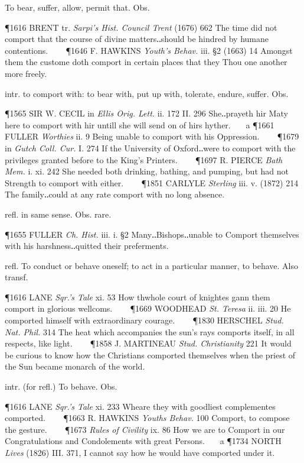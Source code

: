 \begin{description}[wide, labelwidth=!, labelindent=0pt]
\begin{myenumerate}
 To bear, suffer, allow, permit that. Obs.

\P 1616 BRENT tr.  \textit{Sarpi's Hist. Council Trent} (1676) 662 The time did not comport that the course of divine matters‥should be hindred by humane contentions.    
\P 1646 F. HAWKINS  \textit{Youth's Behav.} iii. §2 (1663) 14 Amongst them the custome doth comport in certain places that they Thou one another more freely.

 intr. to comport with: to bear with, put up with, tolerate, endure, suffer. Obs.

\P 1565 SIR W. CECIL in \textit{Ellis Orig. Lett.} ii. 172 II. 296 She‥prayeth hir Maty here to comport with hir untill she will send on of hirs hyther.    a 
\P 1661 FULLER  \textit{Worthies} ii. 9 Being unable to comport with his Oppression.    
\P 1679 in  \textit{Gutch Coll. Cur.} I. 274 If the University of Oxford‥were to comport with the privileges granted before to the King's Printers.    
\P 1697 R. PIERCE  \textit{Bath Mem.} i. xi. 242 She needed both drinking, bathing, and pumping, but had not Strength to comport with either.    
\P 1851 CARLYLE  \textit{Sterling} iii. v. (1872) 214 The family‥could at any rate comport with no long absence.

 refl. in same sense. Obs. rare.

\P 1655 FULLER  \textit{Ch. Hist.} iii. i. §2 Many‥Bishops‥unable to Comport themselves with his harshness‥quitted their preferments.

 refl. To conduct or behave oneself; to act in a particular manner, to behave. Also transf.

\P 1616 LANE  \textit{Sqr.'s Tale} xi. 53 How thwhole court of knightes gann them comport in glorious wellcoms.    
\P 1669 WOODHEAD  \textit{St. Teresa} ii. iii. 20 He comported himself with extraordinary courage.    
\P 1830 HERSCHEL  \textit{Stud. Nat. Phil.} 314 The heat which accompanies the sun's rays comports itself, in all respects, like light.    
\P 1858 J. MARTINEAU  \textit{Stud. Christianity} 221 It would be curious to know how the Christians comported themselves when the priest of the Sun became monarch of the world.

 intr. (for refl.) To behave. Obs.

\P 1616 LANE  \textit{Sqr.'s Tale} xi. 233 Wheare they with goodliest complementes comported.    
\P 1663 R. HAWKINS  \textit{Youths Behav.} 100 Comport, to compose the gesture.    
\P 1673 \textit{Rules  of Civility} ix. 86 How we are to Comport in our Congratulations and Condolements with great Persons.    a 
\P 1734 NORTH  \textit{Lives} (1826) III. 371, I cannot say how he would have comported under it.


\end{myenumerate}
\end{description}
